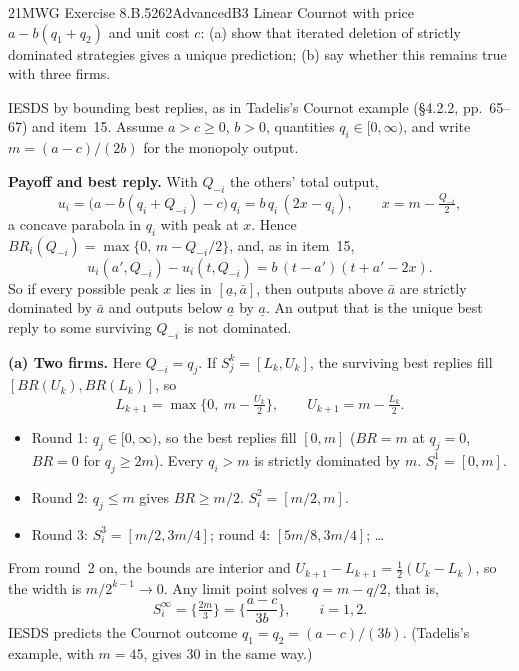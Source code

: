 \begin{exsol}{21}{MWG Exercise 8.B.5}{262}{Advanced}{B3}
\asked Linear Cournot with price $a - b(q_1 + q_2)$ and unit cost $c$: (a) show that iterated
deletion of strictly dominated strategies gives a unique prediction; (b) say whether this
remains true with three firms.

\method IESDS by bounding best replies, as in Tadelis's Cournot example (\S4.2.2, pp.~65--67)
and item~15. Assume $a > c \ge 0$, $b > 0$, quantities $q_i \in [0, \infty)$, and write
$m = (a-c)/(2b)$ for the monopoly output.

\solution
\textbf{Payoff and best reply.} With $Q_{-i}$ the others' total output,
\[
  u_i = \big(a - b(q_i + Q_{-i}) - c\big)\, q_i = b\, q_i\,(2x - q_i), \qquad x = m - \tfrac{Q_{-i}}{2},
\]
a concave parabola in $q_i$ with peak at $x$. Hence $BR_i(Q_{-i}) = \max\{0,\, m - Q_{-i}/2\}$,
and, as in item~15,
\[
  u_i(a', Q_{-i}) - u_i(t, Q_{-i}) = b\,(t - a')(t + a' - 2x). \tag{1}
\]
So if every possible peak $x$ lies in $[\underline a, \bar a]$, then outputs above $\bar a$ are
strictly dominated by $\bar a$ and outputs below $\underline a$ by $\underline a$. An output that
is the unique best reply to some surviving $Q_{-i}$ is not dominated.

\textbf{(a) Two firms.} Here $Q_{-i} = q_j$. If $S_j^k = [L_k, U_k]$, the surviving best replies
fill $[BR(U_k), BR(L_k)]$, so
\[
  L_{k+1} = \max\{0,\ m - \tfrac{U_k}{2}\}, \qquad U_{k+1} = m - \tfrac{L_k}{2}.
\]
\begin{itemize}
  \item Round 1: $q_j \in [0, \infty)$, so the best replies fill $[0, m]$ ($BR = m$ at $q_j = 0$,
  $BR = 0$ for $q_j \ge 2m$). Every $q_i > m$ is strictly dominated by $m$. $S_i^1 = [0, m]$.
  \item Round 2: $q_j \le m$ gives $BR \ge m/2$. $S_i^2 = [m/2, m]$.
  \item Round 3: $S_i^3 = [m/2, 3m/4]$; round 4: $[5m/8, 3m/4]$; \dots
\end{itemize}
From round~2 on, the bounds are interior and $U_{k+1} - L_{k+1} = \tfrac12 (U_k - L_k)$, so the
width is $m/2^{k-1} \to 0$. Any limit point solves $q = m - q/2$, that is,
\[
  S_i^\infty = \Big\{\tfrac{2m}{3}\Big\} = \Big\{\frac{a - c}{3b}\Big\}, \qquad i = 1, 2 .
\]
IESDS predicts the Cournot outcome $q_1 = q_2 = (a-c)/(3b)$. (Tadelis's example, with
$m = 45$, gives 30 in the same way.)


\end{exsol}
